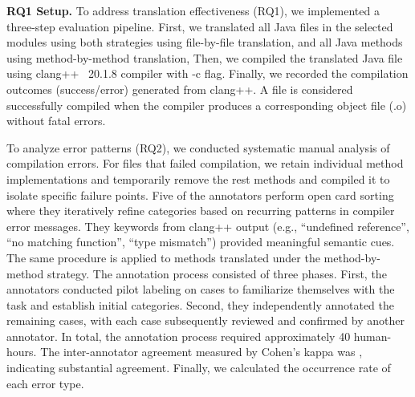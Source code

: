 

\textbf{RQ1 Setup.} To address translation effectiveness (RQ1), we implemented a three-step evaluation pipeline. First, we translated all Java files in the selected modules using both strategies using file-by-file translation, and all Java methods using method-by-method translation,  Then, we compiled the translated Java file using clang++~\cite{clang} 20.1.8 compiler with -c flag.  Finally, we recorded the compilation outcomes (success/error) generated from clang++. A file is considered successfully compiled when the compiler produces a corresponding object file (.o) without fatal errors.

 To analyze error patterns (RQ2), we conducted systematic manual analysis of compilation errors. For files that failed compilation, we retain individual method implementations and temporarily remove the rest methods and compiled it to isolate specific failure points. Five of the annotators perform open card sorting where they iteratively refine categories based on recurring patterns in compiler error messages. They keywords from clang++ output (e.g., ``undefined reference'', ``no matching function'', ``type mismatch'') provided meaningful semantic cues. The same procedure is applied to methods translated under the method-by-method strategy. The annotation process consisted of three phases. First, the annotators conducted pilot labeling on  cases to familiarize themselves with the task and establish initial categories. Second, they independently annotated the remaining cases, with each case subsequently reviewed and confirmed by another annotator. 
 In total, the annotation process required approximately 40 human-hours. The inter-annotator agreement measured by Cohen's kappa was , indicating substantial agreement. Finally, we calculated the occurrence rate of each error type.





